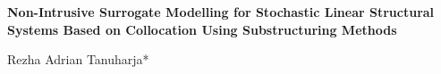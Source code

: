  {
    \fancyhf{}
}

\begin{center}
    \large{\textbf{
        Non-Intrusive Surrogate Modelling for Stochastic Linear Structural Systems
        Based on Collocation Using Substructuring Methods
    } }\\[11pt]
\end{center}
\begin{center}
    Rezha Adrian Tanuharja*\\[5pt]
\end{center}

\long{}

{
    \let\thefootnote\relax{}
}


